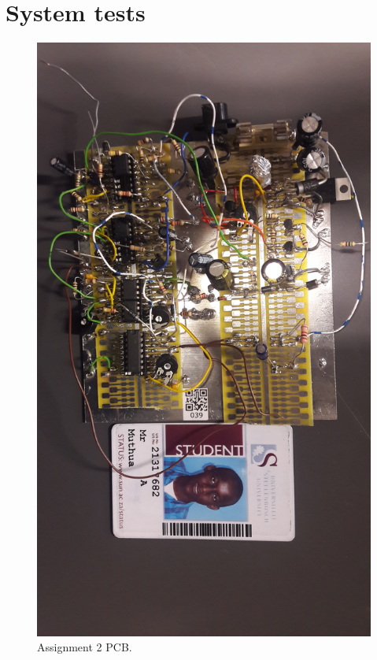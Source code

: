 \chapter{System tests}
\begin{figure}
        \centering
         \includegraphics[width=0.5\linewidth]{./Figures/Assignment2_PCB}
		    \caption{Assignment 2 PCB.} \label{fig:pcb}
 \end{figure}
 
